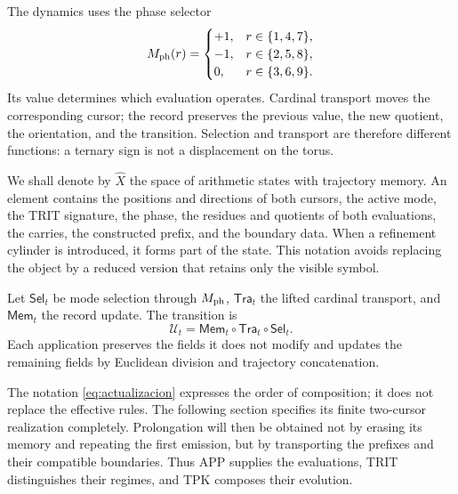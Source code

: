 The dynamics uses the phase selector
\[
 M_{\rm ph}(r)=
 \begin{cases}
 +1,&r\in\{1,4,7\},\\
 -1,&r\in\{2,5,8\},\\
 0,&r\in\{3,6,9\}.
 \end{cases}
\]
Its value determines which evaluation operates. Cardinal transport moves the corresponding cursor; the record preserves the previous value, the new quotient, the orientation, and the transition. Selection and transport are therefore different functions: a ternary sign is not a displacement on the torus.

We shall denote by \(\widehat X\) the space of arithmetic states with trajectory memory. An element contains the positions and directions of both cursors, the active mode, the TRIT signature, the phase, the residues and quotients of both evaluations, the carries, the constructed prefix, and the boundary data. When a refinement cylinder is introduced, it forms part of the state. This notation avoids replacing the object by a reduced version that retains only the visible symbol.

\begin{definition}
Let \(\mathsf{Sel}_t\) be mode selection through \(M_{\rm ph}\), \(\mathsf{Tra}_t\) the lifted cardinal transport, and \(\mathsf{Mem}_t\) the record update. The transition is
\begin{equation}
 \mathcal U_t=\mathsf{Mem}_t\circ\mathsf{Tra}_t\circ\mathsf{Sel}_t.
 \label{eq:actualizacion}
\end{equation}
Each application preserves the fields it does not modify and updates the remaining fields by Euclidean division and trajectory concatenation.
\end{definition}

The notation \eqref{eq:actualizacion} expresses the order of composition; it does not replace the effective rules. The following section specifies its finite two-cursor realization completely. Prolongation will then be obtained not by erasing its memory and repeating the first emission, but by transporting the prefixes and their compatible boundaries. Thus APP supplies the evaluations, TRIT distinguishes their regimes, and TPK composes their evolution.




